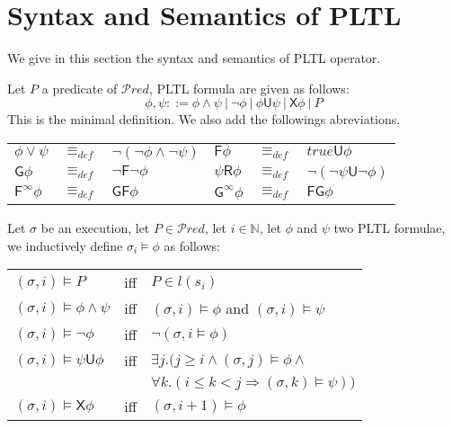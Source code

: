 \section{Syntax and Semantics of PLTL}
\label{appendix-PLTL}


We give in this section the syntax and  semantics of \textsf{PLTL}
operator.
\begin{definition}
Let $P$ a predicate of \(\mathcal{P}red\), \textsf{PLTL} formula
are given as follows:
$$ \phi,\psi ::= \phi \wedge \psi ~ |~  \neg \phi ~  | ~ 
\phi \mathsf{U} \psi ~ |~  \mathsf{X} \phi ~ |~ P  $$
This is the minimal definition. We also add the followings abreviations. 
{\small
\begin{center}
\begin{tabular}{lll|lll}
 $\phi \vee \psi$ &  \qquad $\equiv_{def} $ & \qquad $ \neg( \neg \phi \wedge \neg \psi)$ \qquad & \qquad
 $\mathsf{F} \phi$ &  \qquad$ \equiv_{def} $ & \qquad $ \mathit{true} \mathsf{U} \phi$\\
 $\mathsf{G} \phi $ &  \qquad$\equiv_{def} $ &  \qquad $ \neg \mathsf{F} \neg \phi$  \qquad& \qquad

 $\psi \mathsf{R} \phi $ &  \qquad$\equiv_{def} $ &  \qquad $ \neg (\neg \psi \mathsf{U} \neg \phi)$\\
 $\mathsf{F^{\infty}} \phi$ &  \qquad$ \equiv_{def} $ & \qquad $ \mathsf{G} \mathsf{F} \phi$ \qquad & \qquad
 $\mathsf{G^{\infty}} \phi $ &  \qquad$\equiv_{def} $ &  \qquad $ \mathsf{F} \mathsf{G}  \phi$\\
\end{tabular}
\end{center}
}
\end{definition}

\begin{definition}
Let $\sigma$ be an execution, let $P \in  \mathcal{P}red$,
let $i \in \mathbb{N}$, let $\phi$  and $\psi$ two PLTL formulae,
we inductively define $\sigma_i \models \phi$ as follows:
{\small
\begin{center}
\begin{tabular}{lll}
$(\sigma,i) \models P$ & \qquad iff \qquad & \qquad $ P \in l(s_i)$  \\
$(\sigma,i) \models \phi \wedge \psi$ & \qquad iff \qquad & \qquad $(\sigma,i) \models \phi$ and  $(\sigma,i) \models \psi$\\
$(\sigma,i) \models \neg \phi $ &  \qquad iff \qquad & \qquad $\neg(\sigma,i \models \phi)$\\
$(\sigma,i) \models \psi \mathsf{U} \phi$ & \qquad iff \qquad & \qquad $\exists j . (j \geq i \wedge (\sigma,j) \models \phi \wedge $\\
  & & \qquad \qquad $\forall k . (i \leq k < j \Rightarrow (\sigma,k) \models \psi))$\\
$(\sigma,i) \models \mathsf{X} \phi$ & \qquad iff \qquad  & \qquad $(\sigma,i+1) \models \phi$\\
\end{tabular}
\end{center}
}
\end{definition}

